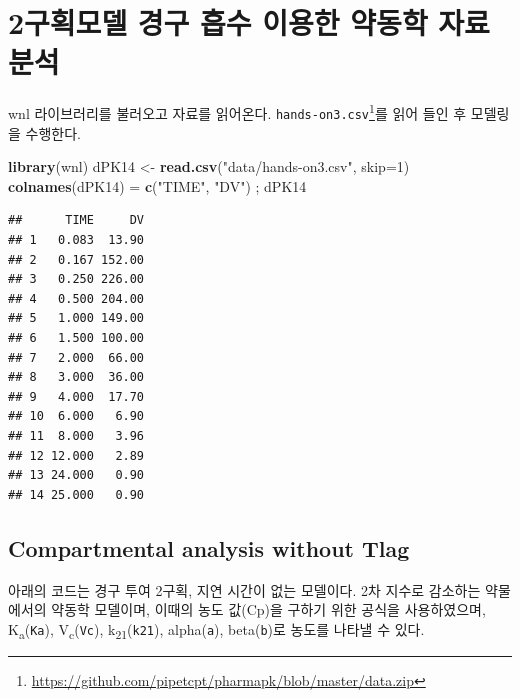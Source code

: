 \documentclass[
  11pt,
  krantz2, a4paper, twoside]{krantz}
\newenvironment{Shaded}{\begin{snugshade}}{\end{snugshade}}
\newcommand{\AttributeTok}[1]{\textcolor[rgb]{0.13,0.29,0.53}{#1}}
\newcommand{\DecValTok}[1]{\textcolor[rgb]{0.00,0.00,0.81}{#1}}
\newcommand{\FunctionTok}[1]{\textcolor[rgb]{0.13,0.29,0.53}{\textbf{#1}}}
\newcommand{\NormalTok}[1]{#1}
\newcommand{\OtherTok}[1]{\textcolor[rgb]{0.56,0.35,0.01}{#1}}
\newcommand{\StringTok}[1]{\textcolor[rgb]{0.31,0.60,0.02}{#1}}
\theoremstyle{definition}
\theoremstyle{definition}
\theoremstyle{definition}
\theoremstyle{definition}
\theoremstyle{remark}
\begin{document}
\normalsize

\section{\texorpdfstring{2구획모델 경구 흡수 이용한 약동학 자료 분석}{2구획모델 경구 흡수 이용한 약동학 자료 분석}}\label{uxad6cuxd68duxbaa8uxb378-uxacbduxad6c-uxd761uxc218-uxc774uxc6a9uxd55c-uxc57duxb3d9uxd559-uxc790uxb8cc-uxbd84uxc11d}

wnl 라이브러리를 불러오고 자료를 읽어온다.
\texttt{hands-on3.csv}\footnote{\url{https://github.com/pipetcpt/pharmapk/blob/master/data.zip}}를 읽어 들인 후 모델링을 수행한다.

\begin{Shaded}
\begin{Highlighting}[]
\FunctionTok{library}\NormalTok{(wnl)}
\NormalTok{dPK14 }\OtherTok{\textless{}{-}} \FunctionTok{read.csv}\NormalTok{(}\StringTok{"data/hands{-}on3.csv"}\NormalTok{, }\AttributeTok{skip=}\DecValTok{1}\NormalTok{)}
\FunctionTok{colnames}\NormalTok{(dPK14) }\OtherTok{=} \FunctionTok{c}\NormalTok{(}\StringTok{"TIME"}\NormalTok{, }\StringTok{"DV"}\NormalTok{) ; dPK14}
\end{Highlighting}
\end{Shaded}

\begin{verbatim}
##      TIME     DV
## 1   0.083  13.90
## 2   0.167 152.00
## 3   0.250 226.00
## 4   0.500 204.00
## 5   1.000 149.00
## 6   1.500 100.00
## 7   2.000  66.00
## 8   3.000  36.00
## 9   4.000  17.70
## 10  6.000   6.90
## 11  8.000   3.96
## 12 12.000   2.89
## 13 24.000   0.90
## 14 25.000   0.90
\end{verbatim}

\subsection{Compartmental analysis without Tlag}\label{compartmental-analysis-without-tlag-1}

아래의 코드는 경구 투여 2구획, 지연 시간이 없는 모델이다. 
2차 지수로 감소하는 약물에서의 약동학 모델이며, 이때의 농도 값(Cp)을 구하기 위한 공식을 사용하였으며, K\textsubscript{a}(\texttt{Ka}), V\textsubscript{c}(\texttt{Vc}), k\textsubscript{21}(\texttt{k21}), alpha(\texttt{a}), beta(\texttt{b})로 농도를 나타낼 수 있다.
\end{document}
